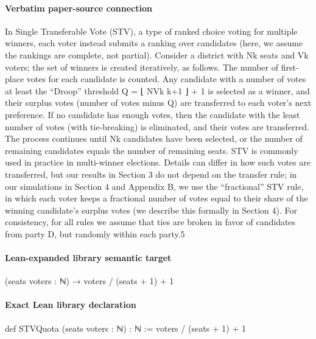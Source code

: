 \documentclass[10pt]{article}
\begin{document}
\paragraph{Verbatim paper-source connection}
\begin{ReviewVerbatim}
In Single Transferable Vote (STV), a type of ranked choice voting for multiple winners, each
voter instead submits a ranking over candidates (here, we assume the rankings are complete, not
partial). Consider a district with Nk seats and Vk voters; the set of winners is created iteratively, as
follows. The number of first-place votes for each candidate is counted. Any candidate with a number
of votes at least the “Droop” threshold Q = ⌊ NVk k+1 ⌋ + 1 is selected as a winner, and their surplus
votes (number of votes minus Q) are transferred to each voter’s next preference. If no candidate has
enough votes, then the candidate with the least number of votes (with tie-breaking) is eliminated,
and their votes are transferred. The process continues until Nk candidates have been selected, or
the number of remaining candidates equals the number of remaining seats. STV is commonly used
in practice in multi-winner elections.
    Details can differ in how such votes are transferred, but our results in Section 3 do not depend
on the transfer rule; in our simulations in Section 4 and Appendix B, we use the “fractional” STV
rule, in which each voter keeps a fractional number of votes equal to their share of the winning
candidate’s surplus votes (we describe this formally in Section 4). For consistency, for all rules we
assume that ties are broken in favor of candidates from party D, but randomly within each party.5
\end{ReviewVerbatim}

\paragraph{Lean-expanded library semantic target}
\begin{ReviewVerbatim}
(seats voters : ℕ) → voters / (seats + 1) + 1
\end{ReviewVerbatim}

\paragraph{Exact Lean library declaration}
\begin{ReviewVerbatim}
def STVQuota (seats voters : ℕ) : ℕ :=
  voters / (seats + 1) + 1
\end{ReviewVerbatim}
\end{document}
